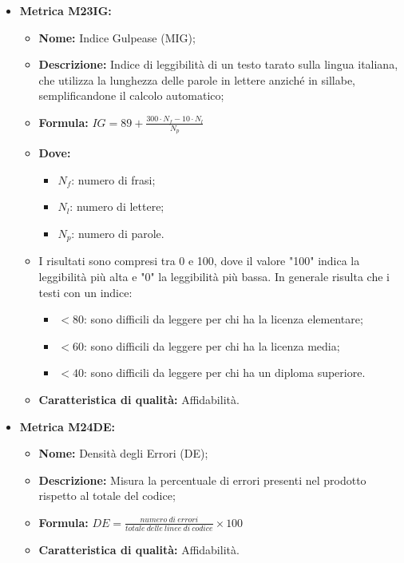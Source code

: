 \begin{itemize}
    \item \hypertarget{item:M23IG}{\textbf{Metrica M23IG:}}
    \begin{minipage}[t]{0.9\textwidth}
            \begin{itemize}
                \item \textbf{Nome:} Indice Gulpease (MIG);
                \item \textbf{Descrizione:} Indice di leggibilità di un testo tarato sulla lingua italiana, che utilizza la lunghezza delle parole in lettere anziché in sillabe, semplificandone il calcolo automatico;
                \item \textbf{Formula:} $IG = 89 + \frac{300 \cdot N_f - 10 \cdot N_l}{N_p}$
                \item \textbf{Dove:}
                      \begin{itemize}
                          \item $N_f$: numero di frasi;
                          \item $N_l$: numero di lettere;
                          \item $N_p$: numero di parole.
                      \end{itemize}
                \item I risultati sono compresi tra 0 e 100, dove il valore "100" indica la leggibilità più alta e "0" la leggibilità più bassa. In generale risulta che i testi con un indice:
                      \begin{itemize}
                          \item $< 80$: sono difficili da leggere per chi ha la licenza elementare;
                          \item $< 60$: sono difficili da leggere per chi ha la licenza media;
                          \item $< 40$: sono difficili da leggere per chi ha un diploma superiore.
                      \end{itemize}
                \item \textbf{Caratteristica di qualità:} Affidabilità.
            \end{itemize}
        \end{minipage}

        \item \hypertarget{item:M23IG}{\textbf{Metrica M24DE:}}
        \begin{minipage}[t]{0.9\textwidth}
                  \begin{itemize}
                      \item \textbf{Nome:} Densità degli Errori (DE);
                      \item \textbf{Descrizione:} Misura la percentuale di errori presenti nel prodotto rispetto al totale del codice;
                      \item \textbf{Formula:} $DE = \frac{numero \ di \ errori}{totale \ delle \ linee \ di \ codice} \times 100$
                      \item \textbf{Caratteristica di qualità:} Affidabilità.
                  \end{itemize}
                \end{minipage}



\end{itemize}
